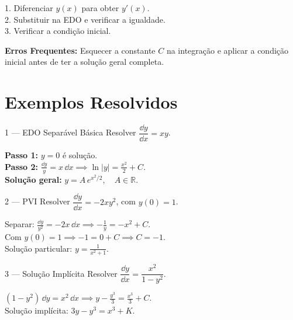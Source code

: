 \begin{tipbox}[title={Como Verificar uma Solução}]
  1. Diferenciar $y(x)$ para obter $y'(x)$. \\
  2. Substituir na EDO e verificar a igualdade. \\
  3. Verificar a condição inicial.
\end{tipbox}

\begin{warnbox}
  \textbf{Erros Frequentes:} Esquecer a constante $C$ na integração e aplicar a condição inicial antes de ter a solução geral completa.
\end{warnbox}

\section{Exemplos Resolvidos}

\begin{exbox}{1 --- EDO Separável Básica}
  Resolver $\dfrac{\dd y}{\dd x} = xy$.
\end{exbox}
\begin{solbox}
  \textbf{Passo 1:} $y=0$ é solução. \\
  \textbf{Passo 2:} $\frac{\dd y}{y} = x\,\dd x \implies \ln|y| = \frac{x^2}{2} + C$. \\
  \textbf{Solução geral:} $\boxed{y = A\,e^{x^2/2}, \quad A\in\mathbb{R}.}$
\end{solbox}

\begin{exbox}{2 --- PVI}
  Resolver $\dfrac{\dd y}{\dd x} = -2xy^2$, com $y(0) = 1$.
\end{exbox}
\begin{solbox}
  Separar: $\frac{\dd y}{y^2} = -2x\,\dd x \implies -\frac{1}{y} = -x^2 + C$. \\
  Com $y(0)=1 \implies -1 = 0 + C \implies C = -1$. \\
  Solução particular: $\boxed{y = \frac{1}{x^2+1}.}$
\end{solbox}

\begin{exbox}{3 --- Solução Implícita}
  Resolver $\dfrac{\dd y}{\dd x} = \dfrac{x^2}{1-y^2}$.
\end{exbox}
\begin{solbox}
  $(1-y^2)\,\dd y = x^2\,\dd x \implies y - \frac{y^3}{3} = \frac{x^3}{3} + C$. \\
  Solução implícita: $\boxed{3y - y^3 = x^3 + K.}$
\end{solbox}

